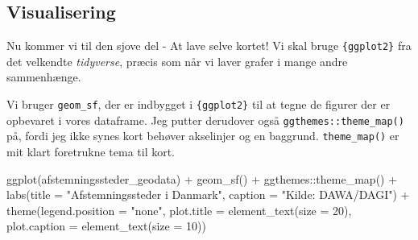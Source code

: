 \documentclass[
  a4paper,
  DIV=11,
  numbers=noendperiod,
  oneside]{scrartcl}
\newenvironment{Shaded}{\begin{snugshade}}{\end{snugshade}}
\newcommand{\AttributeTok}[1]{\textcolor[rgb]{0.40,0.45,0.13}{#1}}
\newcommand{\DecValTok}[1]{\textcolor[rgb]{0.68,0.00,0.00}{#1}}
\newcommand{\FunctionTok}[1]{\textcolor[rgb]{0.28,0.35,0.67}{#1}}
\newcommand{\NormalTok}[1]{\textcolor[rgb]{0.00,0.23,0.31}{#1}}
\newcommand{\SpecialCharTok}[1]{\textcolor[rgb]{0.37,0.37,0.37}{#1}}
\newcommand{\StringTok}[1]{\textcolor[rgb]{0.13,0.47,0.30}{#1}}
\begin{document}
\subsection{Visualisering}\label{visualisering}

Nu kommer vi til den sjove del - At lave selve kortet! Vi skal bruge
\texttt{\{ggplot2\}} fra det velkendte \emph{tidyverse}, præcis som når
vi laver grafer i mange andre sammenhænge.

Vi bruger \texttt{geom\_sf}, der er indbygget i \texttt{\{ggplot2\}} til
at tegne de figurer der er opbevaret i vores dataframe. Jeg putter
derudover også \texttt{ggthemes::theme\_map()} på, fordi jeg ikke synes
kort behøver akselinjer og en baggrund. \texttt{theme\_map()} er mit
klart foretrukne tema til kort.

\begin{Shaded}
\begin{Highlighting}[]
\FunctionTok{ggplot}\NormalTok{(afstemningssteder\_geodata) }\SpecialCharTok{+}
  \FunctionTok{geom\_sf}\NormalTok{() }\SpecialCharTok{+}
\NormalTok{  ggthemes}\SpecialCharTok{::}\FunctionTok{theme\_map}\NormalTok{() }\SpecialCharTok{+}
  \FunctionTok{labs}\NormalTok{(}\AttributeTok{title =} \StringTok{"Afstemningssteder i Danmark"}\NormalTok{,}
       \AttributeTok{caption =} \StringTok{"Kilde: DAWA/DAGI"}\NormalTok{) }\SpecialCharTok{+}
  \FunctionTok{theme}\NormalTok{(}\AttributeTok{legend.position =} \StringTok{"none"}\NormalTok{,}
        \AttributeTok{plot.title =} \FunctionTok{element\_text}\NormalTok{(}\AttributeTok{size =} \DecValTok{20}\NormalTok{),}
        \AttributeTok{plot.caption =} \FunctionTok{element\_text}\NormalTok{(}\AttributeTok{size =} \DecValTok{10}\NormalTok{))}
\end{Highlighting}
\end{Shaded}

{
\makeatletter
\def\LT@makecaption#1#2#3{%
  \noalign{\smash{\hbox{\kern\textwidth\rlap{\kern\marginparsep
  \parbox[t]{\marginparwidth}{%
    \footnotesize{%
      \vspace{(1.1\baselineskip)}
    #1{#2: }\ignorespaces #3}}}}}}%
    }
\makeatother

\begin{figure}[tbh]



\end{figure}%

}
\end{document}
